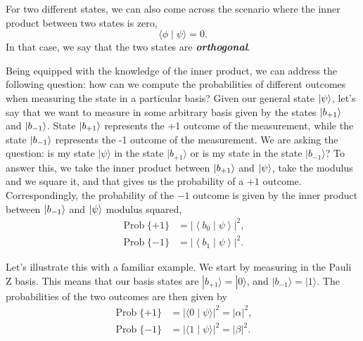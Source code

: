 For two different states, we can also come across the scenario where the inner product between two states is zero,
\begin{equation}
\langle\phi \mid \psi\rangle=0.
\end{equation}
In that case, we say that the two states are \textbf{\emph{orthogonal}}.

Being equipped with the knowledge of the inner product, we can address the following question: how can we compute the probabilities of different outcomes when measuring the state in a particular basis?
Given our general state $\left| \psi \right\rangle$, let's say that we want to measure in some arbitrary basis given by the states $\left| b_{+1} \right\rangle$ and $\left| b_{-1} \right\rangle$.
State $\left| b_{+1} \right\rangle$ represents the +1 outcome of the measurement, while the state $\left| b_{-1} \right\rangle$ represents the -1 outcome of the measurement.
We are asking the question: is my state $|\psi\rangle$ in the state $|b_{+1}\rangle$ or is my state in the state $|b_{-1}\rangle$?
To answer this, we take the inner product between $\left| b_{+1} \right\rangle$ and $\left| \psi \right\rangle$, take the modulus and we square it, and that gives us the probability of a $+1$ outcome. Correspondingly, the probability of the $-1$ outcome is given by the inner product between $\left| b_{-1} \right\rangle$ and $\left| \psi \right\rangle$ modulus squared,
\begin{equation}
\begin{aligned}
    \operatorname{Prob}\{+1\}&=\left|\left\langle b_{0}\mid \psi\right\rangle\right|^{2}, \\
    \operatorname{Prob}\{-1\}&=\left|\left\langle b_{1}\mid \psi\right\rangle\right|^{2}.
\end{aligned}
\end{equation}

Let's illustrate this with a familiar example. We start by measuring in the Pauli Z basis. This means that our basis states are $|b_{+1}\rangle=|0\rangle$, and $|b_{-1}\rangle=|1\rangle$. The probabilities of the two outcomes are then given by
\begin{equation}
\begin{aligned}
    \operatorname{Prob}\{+1\} &=|\langle 0 \mid \psi\rangle|^2=|\alpha|^2, \\
    \operatorname{Prob}\{-1\} &=|\langle 1 \mid \psi\rangle|^2=|\beta|^2.
\end{aligned}
\end{equation}


